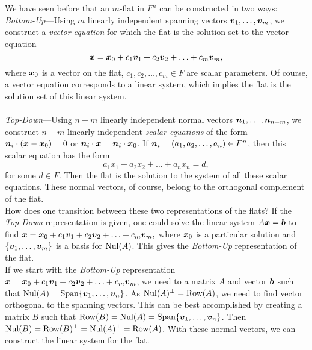 We have seen before that an $m$-flat in $F^n$ can be constructed in two ways:\\
\emph{Bottom-Up}---Using $m$ linearly independent spanning vectors $\boldsymbol v_1,\ldots, \boldsymbol v_m$, we construct a \emph{vector equation} for which the flat is the solution set to the vector equation
\[\boldsymbol x = \boldsymbol x_0 + c_1\boldsymbol v_1 + c_2\boldsymbol v_2 + \ldots + c_m\boldsymbol v_m,\] where $\boldsymbol x_0$ is a vector on the flat, $c_1, c_2,\ldots, c_m\in F$ are scalar parameters. Of course, a vector equation corresponds to a linear system, which implies the flat is the solution set of this linear system.\\\\
\emph{Top-Down}---Using $n-m$ linearly independent normal vectors $\boldsymbol n_1, \ldots, \boldsymbol n_{n-m}$, we construct $n-m$ linearly independent \emph{scalar equations} of the form $\boldsymbol n_{i}\cdot (\boldsymbol x - \boldsymbol x_0) = 0$ or $\boldsymbol n_i \cdot \boldsymbol x = \boldsymbol n_i \cdot \boldsymbol x_0$. If $\boldsymbol n_i = (a_1, a_2, \ldots, a_n)\in F^n$, then this scalar equation has the form 
\[a_1x_1 + a_2x_2 + \ldots + a_nx_n = d,\] for some $d\in F$. Then the flat is the solution to the system of all these scalar equations. These normal vectors, of course, belong to the orthogonal complement of the flat.\\

How does one transition between these two representations of the flats? If the \emph{Top-Down} representation is given, one could solve the linear system $A\boldsymbol x=\boldsymbol b$ to find $\boldsymbol x = \boldsymbol x_0 + c_1\boldsymbol v_1 + c_2\boldsymbol v_2 + \ldots + c_m\boldsymbol v_m,$ where $\boldsymbol x_0$ is a particular solution and $\{\boldsymbol v_1,\ldots, \boldsymbol v_m\}$ is a basis for $\operatorname{Nul}(A)$. This gives the \emph{Bottom-Up} representation of the flat.\\

If we start with the \emph{Bottom-Up} representation $\boldsymbol x = \boldsymbol x_0 + c_1\boldsymbol v_1 + c_2\boldsymbol v_2 + \ldots + c_m\boldsymbol v_m$, we need to a matrix $A$ and vector $\boldsymbol b$ such that $\operatorname{Nul}(A) = \operatorname{Span}\{\boldsymbol v_1, \ldots, \boldsymbol v_n\}$. As $\operatorname{Nul}(A)^\perp = \operatorname*{Row}(A)$, we need to find vector orthogonal to the spanning vectors. This can be best accomplished by creating a matrix $B$ such that $\operatorname*{Row}(B) = \operatorname{Nul}(A) = \operatorname{Span}\{\boldsymbol v_1, \ldots, \boldsymbol v_n\}$. Then $\operatorname{Nul}(B) = \operatorname*{Row}(B)^\perp = \operatorname{Nul}(A)^\perp = \operatorname*{Row}(A)$. With these normal vectors, we can construct the linear system for the flat.\\

